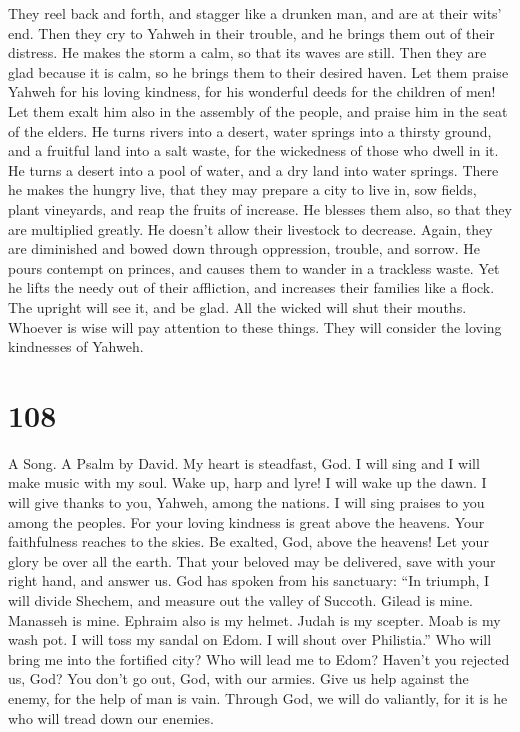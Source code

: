  They reel back and forth, and stagger like a drunken man,
and are at their wits' end.  Then they cry to Yahweh in
their trouble, and he brings them out of their distress. 
He makes the storm a calm, so that its waves are still. 
Then they are glad because it is calm, so he brings them to their
desired haven.  Let them praise Yahweh for his loving
kindness, for his wonderful deeds for the children of men! 
Let them exalt him also in the assembly of the people, and praise him in
the seat of the elders.  He turns rivers into a desert,
water springs into a thirsty ground,  and a fruitful land
into a salt waste, for the wickedness of those who dwell in it.
 He turns a desert into a pool of water, and a dry land
into water springs.  There he makes the hungry live, that
they may prepare a city to live in,  sow fields, plant
vineyards, and reap the fruits of increase.  He blesses
them also, so that they are multiplied greatly. He doesn't allow their
livestock to decrease.  Again, they are diminished and
bowed down through oppression, trouble, and sorrow.  He
pours contempt on princes, and causes them to wander in a trackless
waste.  Yet he lifts the needy out of their affliction, and
increases their families like a flock.  The upright will
see it, and be glad. All the wicked will shut their mouths.
 Whoever is wise will pay attention to these things. They
will consider the loving kindnesses of Yahweh.

\hypertarget{section-98}{%
\section{108}\label{section-98}}

A Song. A Psalm by David.  My heart is steadfast, God. I
will sing and I will make music with my soul.  Wake up, harp
and lyre! I will wake up the dawn.  I will give thanks to
you, Yahweh, among the nations. I will sing praises to you among the
peoples.  For your loving kindness is great above the
heavens. Your faithfulness reaches to the skies.  Be
exalted, God, above the heavens! Let your glory be over all the earth.
 That your beloved may be delivered, save with your right
hand, and answer us.  God has spoken from his sanctuary:
``In triumph, I will divide Shechem, and measure out the valley of
Succoth.  Gilead is mine. Manasseh is mine. Ephraim also is
my helmet. Judah is my scepter.  Moab is my wash pot. I will
toss my sandal on Edom. I will shout over Philistia.''  Who
will bring me into the fortified city? Who will lead me to Edom?
 Haven't you rejected us, God? You don't go out, God, with
our armies.  Give us help against the enemy, for the help
of man is vain.  Through God, we will do valiantly, for it
is he who will tread down our enemies.

